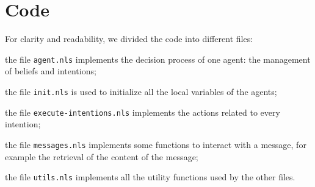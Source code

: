 \section{Code}

For clarity and readability, we divided the code into different files:
\begin{enumerate*}[label=(\roman*)]
\item the file \texttt{agent.nls} implements the decision process of one agent: the management of beliefs and intentions;
\item the file \texttt{init.nls} is used to initialize all the local variables of the agents;
\item the file \texttt{execute-intentions.nls} implements the actions related to every intention;
\item the file \texttt{messages.nls} implements some functions to interact with a message, for example the retrieval of the content of the message;
\item the file \texttt{utils.nls} implements all the utility functions used by the other files.
\end{enumerate*}
